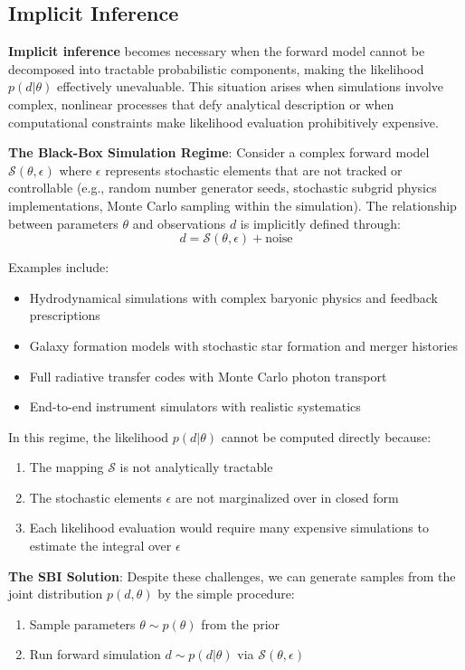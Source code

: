 \documentclass[11pt,a4paper]{article}
\theoremstyle{definition}
\begin{document}
\subsection{Implicit Inference}

\textbf{Implicit inference} becomes necessary when the forward model cannot be decomposed into tractable probabilistic components, making the likelihood $p(d|\theta)$ effectively unevaluable. This situation arises when simulations involve complex, nonlinear processes that defy analytical description or when computational constraints make likelihood evaluation prohibitively expensive.

\textbf{The Black-Box Simulation Regime}: Consider a complex forward model $\mathcal{S}(\theta, \epsilon)$ where $\epsilon$ represents stochastic elements that are not tracked or controllable (e.g., random number generator seeds, stochastic subgrid physics implementations, Monte Carlo sampling within the simulation). The relationship between parameters $\theta$ and observations $d$ is implicitly defined through:
\begin{equation}
    d = \mathcal{S}(\theta, \epsilon) + \text{noise}
\end{equation}

Examples include:
\begin{itemize}
    \item Hydrodynamical simulations with complex baryonic physics and feedback prescriptions
    \item Galaxy formation models with stochastic star formation and merger histories  
    \item Full radiative transfer codes with Monte Carlo photon transport
    \item End-to-end instrument simulators with realistic systematics
\end{itemize}

In this regime, the likelihood $p(d|\theta)$ cannot be computed directly because:
\begin{enumerate}
    \item The mapping $\mathcal{S}$ is not analytically tractable
    \item The stochastic elements $\epsilon$ are not marginalized over in closed form
    \item Each likelihood evaluation would require many expensive simulations to estimate the integral over $\epsilon$
\end{enumerate}

\textbf{The SBI Solution}: Despite these challenges, we can generate samples from the joint distribution $p(d, \theta)$ by the simple procedure:
\begin{enumerate}
    \item Sample parameters $\theta \sim p(\theta)$ from the prior
    \item Run forward simulation $d \sim p(d|\theta)$ via $\mathcal{S}(\theta, \epsilon)$
\end{enumerate}
\end{document}
